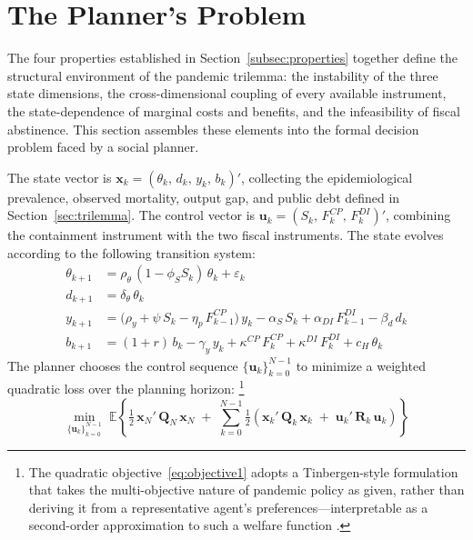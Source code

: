 \documentclass[12pt, a4paper]{article}
\begin{document}
\section{The Planner's Problem}
\label{sec:planner}

The four properties established in Section~\ref{subsec:properties} together define the structural environment of the pandemic trilemma: the instability of the three state dimensions, the cross-dimensional coupling of every available instrument, the state-dependence of marginal costs and benefits, and the infeasibility of fiscal abstinence. This section assembles these elements into the formal decision problem faced by a social planner.

The state vector is $\mathbf{x}_k = (\theta_k,\, d_k,\, y_k,\, b_k)'$, collecting the epidemiological prevalence, observed mortality, output gap, and public debt defined in Section~\ref{sec:trilemma}. The control vector is $\mathbf{u}_k = (S_k,\, F^{CP}_k,\, F^{DI}_k)'$, combining the containment instrument with the two fiscal instruments. The state evolves according to the following transition system:
%
\begin{align}
    \theta_{k+1} &= \rho_\theta\,(1 - \phi_S S_k)\, \theta_k + \varepsilon_k \label{eq:plan_theta}\\[3pt]
    d_{k+1} &= \delta_\theta\, \theta_k \label{eq:plan_d}\\[3pt]
    y_{k+1} &= \bigl(\rho_y + \psi\, S_k - \eta_p\, F^{CP}_{k-1}\bigr)\, y_k - \alpha_S\, S_k + \alpha_{DI}\, F^{DI}_{k-1} - \beta_d\, d_k \label{eq:plan_y}\\[3pt]
    b_{k+1} &= (1+r)\, b_k - \gamma_y\, y_k + \kappa^{CP}\, F^{CP}_k + \kappa^{DI}\, F^{DI}_k + c_H\, \theta_k \label{eq:plan_b}
\end{align}
%
The planner chooses the control sequence $\{\mathbf{u}_k\}_{k=0}^{N-1}$ to minimize a weighted quadratic loss over the planning horizon: \footnote{The quadratic objective~\eqref{eq:objective1} adopts a Tinbergen-style formulation that takes the multi-objective nature of pandemic policy as given, rather than deriving it from a representative agent's preferences---interpretable as a second-order approximation to such a welfare function \citep{woodford2003}.}
%
\begin{equation}
    \min_{\{\mathbf{u}_k\}_{k=0}^{N-1}} \; \mathbb{E}\left\{\tfrac{1}{2}\,\bm{x}_N'\,\bm{Q}_N\,\bm{x}_N
    \;+\; \sum_{k=0}^{N-1}\tfrac{1}{2}\left(\bm{x}_k'\,\bm{Q}_k\,\bm{x}_k
    \;+\; \bm{u}_k'\,\bm{R}_k\,\bm{u}_k\right)\right\}
    \label{eq:objective1}
\end{equation}
\end{document}
